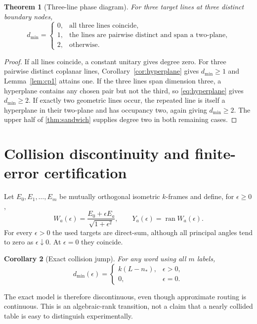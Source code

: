 \documentclass[11pt]{article}
\newtheorem{theorem}{Theorem}[section]
\newtheorem{corollary}[theorem]{Corollary}
\theoremstyle{definition}\newtheorem{definition}[theorem]{Definition}\newtheorem{example}[theorem]{Example}
\theoremstyle{remark}\newtheorem{remark}[theorem]{Remark}\newtheorem{limitation}[theorem]{Limitation}
\newcommand{\ran}{\operatorname{ran}}\newcommand{\Span}{\operatorname{span}}
\begin{document}
\begin{theorem}[Three-line phase diagram]\label{thm:three-lines}
For three target lines at three distinct boundary nodes,
\begin{equation}\label{eq:three-lines}
d_{\min}=\begin{cases}
0,&\text{all three lines coincide},\\
1,&\text{the lines are pairwise distinct and span a two-plane},\\
2,&\text{otherwise}.
\end{cases}
\end{equation}
\end{theorem}

\begin{proof}
If all lines coincide, a constant unitary gives degree zero.  For three
pairwise distinct coplanar lines, Corollary~\ref{cor:hyperplane} gives
$d_{\min}\ge1$ and Lemma~\ref{lem:cp1} attains one.  If the three lines span
dimension three, a hyperplane contains any chosen pair but not the third,
so \eqref{eq:hyperplane} gives $d_{\min}\ge2$.  If exactly two geometric
lines occur, the repeated line is itself a hyperplane in their two-plane and
has occupancy two, again giving $d_{\min}\ge2$.  The upper half of
\cref{thm:sandwich} supplies degree two in both remaining cases.
\end{proof}

\section{Collision discontinuity and finite-error certification}

Let $E_0,E_1,\ldots,E_m$ be mutually orthogonal isometric $k$-frames and
define, for $\epsilon\ge0$,
\begin{equation}\label{eq:collision}
 W_a(\epsilon)=\frac{E_0+\epsilon E_a}{\sqrt{1+\epsilon^2}},
 \qquad Y_a(\epsilon)=\ran W_a(\epsilon).
\end{equation}
For every $\epsilon>0$ the used targets are direct-sum, although all
principal angles tend to zero as $\epsilon\downarrow0$.  At $\epsilon=0$
they coincide.

\begin{corollary}[Exact collision jump]\label{cor:collision}
For any word using all $m$ labels,
\begin{equation}\label{eq:collision-law}
d_{\min}(\epsilon)=\begin{cases}
k(L-n_*),&\epsilon>0,\\
0,&\epsilon=0.
\end{cases}
\end{equation}
\end{corollary}
The exact model is therefore discontinuous, even though approximate routing
is continuous.  This is an algebraic-rank transition, not a claim that a
nearly collided table is easy to distinguish experimentally.
\end{document}
